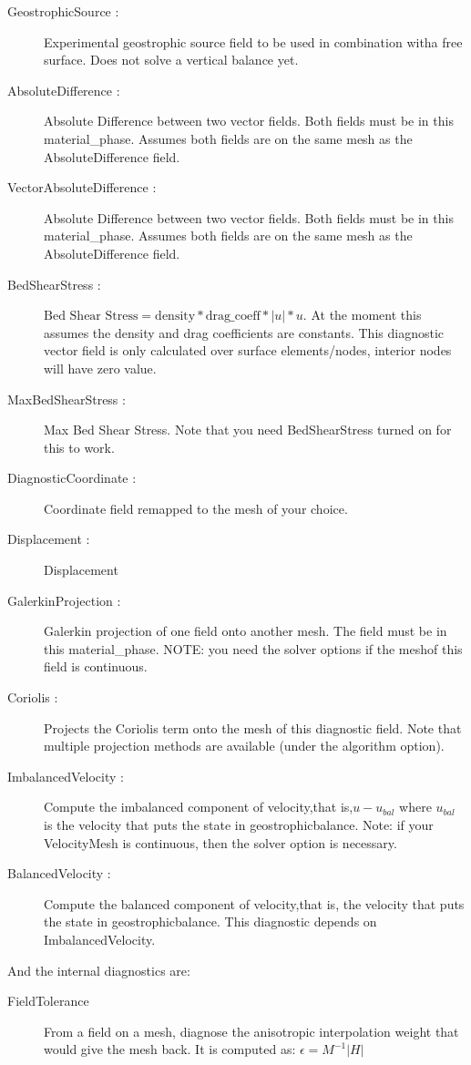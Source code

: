 \begin{description}
 \item[GeostrophicSource :] Experimental geostrophic source field to be used in combination witha free surface. Does not solve a vertical balance yet.    
 \item[AbsoluteDifference :] Absolute Difference between two vector fields. Both fields must be in this material\_phase. Assumes both fields are on the same mesh as the AbsoluteDifference field.    
 \item[VectorAbsoluteDifference :] Absolute Difference between two vector fields. Both fields must be in this material\_phase. Assumes both fields are on the same mesh as the AbsoluteDifference field.    
 \item[BedShearStress :] $\mbox{Bed Shear Stress} = \mbox{density}*\mbox{drag\_coeff}*|u|*u$. At the moment this assumes the density and drag coefficients are constants. This diagnostic vector field is only calculated over surface elements/nodes, interior nodes will have zero value.    
 \item[MaxBedShearStress :] Max Bed Shear Stress. Note that you need BedShearStress turned on for this to work.    
 \item[DiagnosticCoordinate :] Coordinate field remapped to the mesh of your choice.    
 \item[Displacement :] Displacement    
 \item[GalerkinProjection :] Galerkin projection of one field onto another mesh. The field must be in this material\_phase. NOTE: you need the solver options if the meshof this field is continuous.    
 \item[Coriolis :] Projects the Coriolis term onto the mesh of this diagnostic field. Note that multiple projection methods are available (under the algorithm option).    
 \item[ImbalancedVelocity :] Compute the imbalanced component of velocity,that is,$u - u_{bal}$ where $u_{bal}$ is the velocity that puts the state in geostrophicbalance. Note: if your VelocityMesh is continuous, then the solver option is necessary.    
 \item[BalancedVelocity :] Compute the balanced component of velocity,that is, the velocity that puts the state in geostrophicbalance. This diagnostic depends on ImbalancedVelocity.    
\end{description}


And the internal   diagnostics are:

\begin{description}
\item[FieldTolerance] From a field on a mesh, diagnose the anisotropic interpolation weight that would give the mesh back. It is computed as: $\epsilon = M^{-1} |H|$ 
\end{description}


